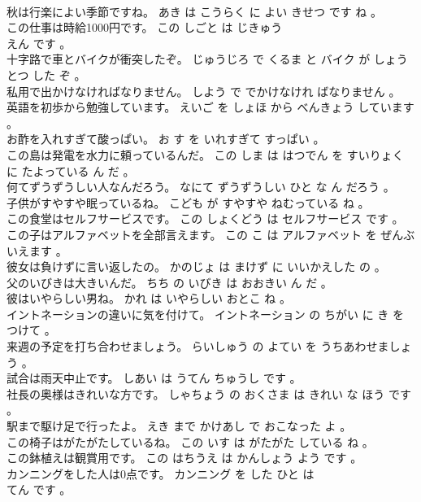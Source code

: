 \documentclass[8pt]{extreport}
\begin{document}
\begin{CJK}{UTF8}{min}
\\	秋は行楽によい季節ですね。	あき は こうらく に よい きせつ です ね 。 
\\	この仕事は時給1000円です。	この しごと は じきゅう 
\\	えん です 。 
\\	十字路で車とバイクが衝突したぞ。	じゅうじろ で くるま と バイク が しょうとつ した ぞ 。 
\\	私用で出かけなければなりません。	しよう で でかけなけれ ばなりません 。 
\\	英語を初歩から勉強しています。	えいご を しょほ から べんきょう しています 。 
\\	お酢を入れすぎて酸っぱい。	お す を いれすぎて すっぱい 。 
\\	この島は発電を水力に頼っているんだ。	この しま は はつでん を すいりょく に たよっている ん だ 。 
\\	何てずうずうしい人なんだろう。	なにて ずうずうしい ひと な ん だろう 。 
\\	子供がすやすや眠っているね。	こども が すやすや ねむっている ね 。 
\\	この食堂はセルフサービスです。	この しょくどう は セルフサービス です 。 
\\	この子はアルファベットを全部言えます。	この こ は アルファベット を ぜんぶ いえます 。 
\\	彼女は負けずに言い返したの。	かのじょ は まけず に いいかえした の 。 
\\	父のいびきは大きいんだ。	ちち の いびき は おおきい ん だ 。 
\\	彼はいやらしい男ね。	かれ は いやらしい おとこ ね 。 
\\	イントネーションの違いに気を付けて。	イントネーション の ちがい に き を つけて 。 
\\	来週の予定を打ち合わせましょう。	らいしゅう の よてい を うちあわせましょう 。 
\\	試合は雨天中止です。	しあい は うてん ちゅうし です 。 
\\	社長の奥様はきれいな方です。	しゃちょう の おくさま は きれい な ほう です 。 
\\	駅まで駆け足で行ったよ。	えき まで かけあし で おこなった よ 。 
\\	この椅子はがたがたしているね。	この いす は がたがた している ね 。 
\\	この鉢植えは観賞用です。	この はちうえ は かんしょう よう です 。 
\\	カンニングをした人は0点です。	カンニング を した ひと は 
\\	てん です 。 

\end{CJK}
\end{document}
